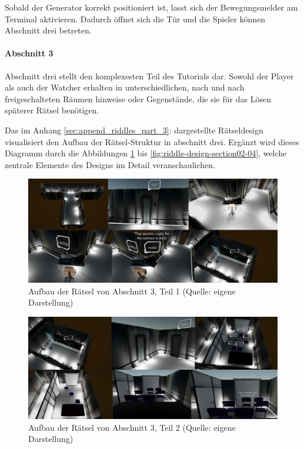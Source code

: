 Sobald der Generator korrekt positioniert ist, lasst sich der Bewegungsmelder am Terminal aktivieren. Dadurch öffnet sich die Tür und die Spieler können Abschnitt drei betreten.

\paragraph{Abschnitt 3}

Abschnitt drei stellt den komplexesten Teil des Tutorials dar. Sowohl der Player als auch der Watcher erhalten in unterschiedlichen, nach und nach freigeschalteten Räumen hinweise oder Gegenstände, die sie für das Lösen späterer Rätsel benötigen.

Das im Anhang  \ref{sec:append_riddles_part_3}:  dargestellte Rätseldesign visualisiert den Aufbau der Rätsel-Struktur in abschnitt drei. Ergänzt wird dieses Diagramm durch die Abbildungen \ref{fig:riddle-design-section02-00} bis \ref{fig:riddle-design-section02-04}, welche zentrale Elemente des Designs im Detail veranschaulichen.

\begin{figure}[ht]
\centering
\includegraphics[width=1\linewidth]{content/pictures/Rätseldesign - Abschnitt02 - Rätsel00.png}
\caption{Aufbau der Rätsel von Abschnitt 3, Teil 1 (Quelle: eigene Darstellung)}
\label{fig:riddle-design-section02-00}
\end{figure}

\begin{figure}[ht]
\centering
\includegraphics[width=1\linewidth]{content/pictures/Rätseldesign - Abschnitt02 - Rätsel01.png}
\caption{Aufbau der Rätsel von Abschnitt 3, Teil 2 (Quelle: eigene Darstellung)}
\label{fig:riddle-design-section02-0l}
\end{figure}

